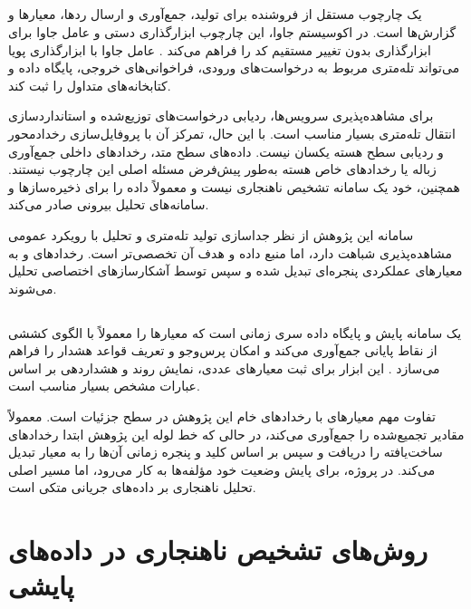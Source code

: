 \subsection{}

 یک چارچوب مستقل از فروشنده برای تولید، جمع‌آوری و
ارسال ردها، معیارها و گزارش‌ها است. در اکوسیستم جاوا، این چارچوب
ابزارگذاری دستی و عامل جاوا برای ابزارگذاری بدون تغییر مستقیم کد را
فراهم می‌کند \cite{opentelemetrydocs,oteljavaagent}. عامل جاوا با
ابزارگذاری پویا می‌تواند تله‌متری مربوط به درخواست‌های ورودی، فراخوانی‌های
خروجی، پایگاه داده و کتابخانه‌های متداول را ثبت کند.

 برای مشاهده‌پذیری سرویس‌ها، ردیابی درخواست‌های
توزیع‌شده و استانداردسازی انتقال تله‌متری بسیار مناسب است. با این حال،
تمرکز آن با پروفایل‌سازی رخدادمحور  و ردیابی سطح هسته یکسان
نیست. داده‌های سطح متد، رخدادهای داخلی جمع‌آوری زباله یا رخدادهای خاص
هسته به‌طور پیش‌فرض مسئله اصلی این چارچوب نیستند. همچنین،
 خود یک سامانه تشخیص ناهنجاری نیست و معمولاً داده را
برای ذخیره‌سازها و سامانه‌های تحلیل بیرونی صادر می‌کند.

سامانه این پژوهش از نظر جداسازی تولید تله‌متری و تحلیل با رویکرد عمومی
مشاهده‌پذیری شباهت دارد، اما منبع داده و هدف آن تخصصی‌تر است. رخدادهای
 و  به معیارهای عملکردی پنجره‌ای تبدیل شده و سپس توسط
آشکارسازهای اختصاصی تحلیل می‌شوند.

\subsection{}

 یک سامانه پایش و پایگاه داده سری زمانی است که معیارها را
معمولاً با الگوی کششی از نقاط پایانی جمع‌آوری می‌کند و امکان پرس‌وجو و
تعریف قواعد هشدار را فراهم می‌سازد \cite{prometheusdocs}. این ابزار برای
ثبت معیارهای عددی، نمایش روند و هشداردهی بر اساس عبارات مشخص بسیار
مناسب است.

تفاوت مهم معیارهای  با رخدادهای خام این پژوهش در سطح
جزئیات است.  معمولاً مقادیر تجمیع‌شده را جمع‌آوری می‌کند،
در حالی که خط لوله این پژوهش ابتدا رخدادهای ساخت‌یافته را دریافت و سپس
بر اساس کلید و پنجره زمانی آن‌ها را به معیار تبدیل می‌کند. در پروژه،
 برای پایش وضعیت خود مؤلفه‌ها به کار می‌رود، اما مسیر
اصلی تحلیل ناهنجاری بر داده‌های جریانی  متکی است.

\section{روش‌های تشخیص ناهنجاری در داده‌های پایشی}
\label{sec:related-anomaly-detection}

